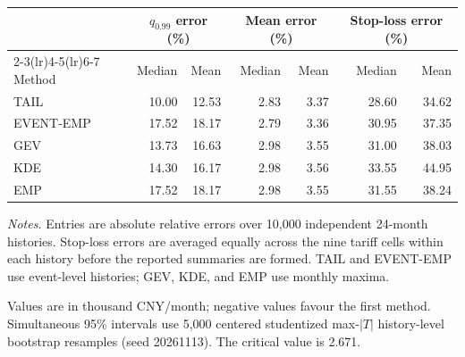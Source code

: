 \documentclass[]{interact}
\providecommand{\tablebodyfont}{\small}
\providecommand{\tablefootnotefont}{\small}
\begin{document}
\begingroup
\centering
{}
\label{tab:si-fidelity}
{\tablebodyfont
\setlength{\tabcolsep}{4pt}
\renewcommand{\arraystretch}{1.15}
\begin{tabular*}{\linewidth}{@{\extracolsep{\fill}}lrrrrrr@{}}
\toprule
&\multicolumn{2}{c}{$q_{0.99}$ error (\%)}&\multicolumn{2}{c}{Mean error (\%)}&\multicolumn{2}{c}{Stop-loss error (\%)}\\
\cmidrule(lr){2-3}\cmidrule(lr){4-5}\cmidrule(lr){6-7}
Method & Median & Mean & Median & Mean & Median & Mean\\
\midrule
TAIL & 10.00 & 12.53 & 2.83 & 3.37 & 28.60 & 34.62\\
EVENT-EMP & 17.52 & 18.17 & 2.79 & 3.36 & 30.95 & 37.35\\
GEV & 13.73 & 16.63 & 2.98 & 3.55 & 31.00 & 38.03\\
KDE & 14.30 & 16.17 & 2.98 & 3.56 & 33.55 & 44.95\\
EMP & 17.52 & 18.17 & 2.98 & 3.55 & 31.55 & 38.24\\\bottomrule
\end{tabular*}}
\par\smallskip
{\tablefootnotefont\textit{Notes.}
Entries are absolute relative errors over 10,000 independent 24-month
histories. Stop-loss errors are averaged equally across the nine tariff
cells within each history before the reported summaries are formed.
TAIL and EVENT-EMP use event-level histories; GEV, KDE, and EMP use
monthly maxima.}
\endgroup




\begin{table}[ht]
\centering\small
\caption{Simultaneous intervals for six focal matched-information regret contrasts.}
\label{tab:focal-maxt}
\par\smallskip\footnotesize Values are in thousand CNY/month; negative values favour the first method. Simultaneous 95\% intervals use 5,000 centered studentized max-$|T|$ history-level bootstrap resamples (seed 20261113). The critical value is 2.671.
\end{table}
\end{document}
